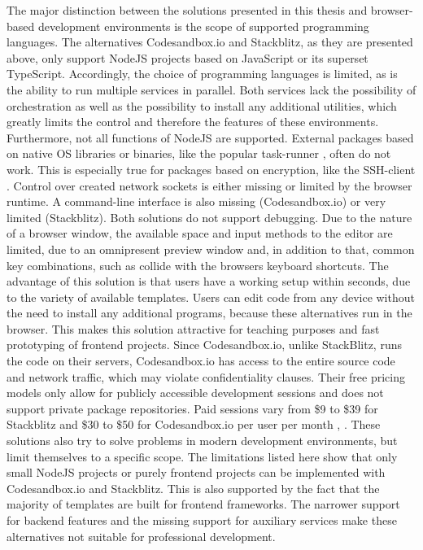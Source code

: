         The major distinction between the solutions presented in this thesis and browser-based development environments is the scope of supported programming languages. The alternatives Codesandbox.io and Stackblitz, as they are presented above, only support NodeJS projects based on JavaScript or its superset TypeScript. Accordingly, the choice of programming languages is limited, as is the ability to run multiple services in parallel. Both services lack the possibility of orchestration as well as the possibility to install any additional utilities, which greatly limits the control and therefore the features of these environments. \newline
        Furthermore, not all functions of NodeJS are supported. External packages based on native \ac{OS} libraries or binaries, like the popular task-runner , often do not work. This is especially true for packages based on encryption, like the \ac{SSH}-client . Control over created network sockets is either missing or limited by the browser runtime. A command-line interface is also missing (Codesandbox.io) or very limited (Stackblitz). Both solutions do not support debugging. Due to the nature of a browser window, the available space and input methods to the editor are limited, due to an omnipresent preview window and, in addition to that, common key combinations, such as  collide with the browsers keyboard shortcuts.\newline
        The advantage of this solution is that users have a working setup within seconds, due to the variety of available templates. Users can edit code from any device without the need to install any additional programs, because these alternatives run in the browser. This makes this solution attractive for teaching purposes and fast prototyping of frontend projects.\newline
        Since Codesandbox.io, unlike StackBlitz, runs the code on their servers, Codesandbox.io has access to the entire source code and network traffic, which may violate confidentiality clauses. Their free pricing models only allow for publicly accessible development sessions and does not support private  package repositories. Paid sessions vary from \$9 to \$39 for Stackblitz and \$30 to \$50 for Codesandbox.io per user per month \cite{stackblitz}, \cite{codesandbox}. \newline
        These solutions also try to solve problems in modern development environments, but limit themselves to a specific scope. The limitations listed here show that only small NodeJS projects or purely frontend projects can be implemented with Codesandbox.io and Stackblitz. This is also supported by the fact that the majority of templates are built for frontend frameworks. The narrower support for backend features and the missing support for auxiliary services make these alternatives not suitable for professional development.

